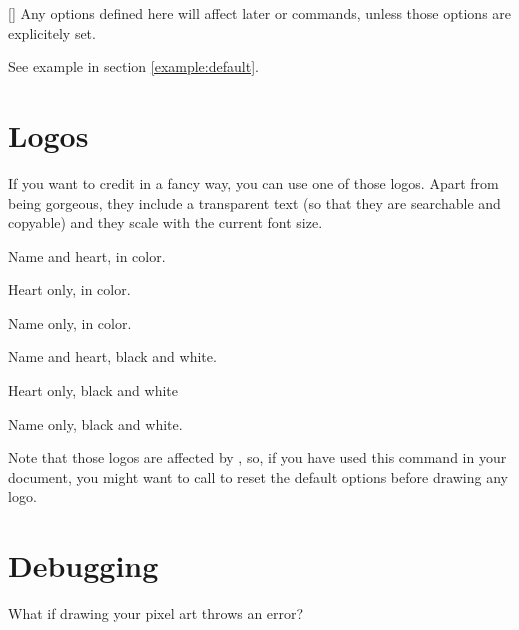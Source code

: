 \documentclass[
  load-preamble-,
  babel-options=english,
  add-index=true,
]{cnltx-doc}
\begin{document}
\begin{commands}
  [] Any options defined here will affect later  or  commands, unless those options are explicitely set.

  See example in section \ref{example:default}.
\end{commands}

\section{Logos}

If you want to credit  in a fancy way, you can use one of those logos. Apart from being gorgeous, they include a transparent text (so that they are searchable and copyable) and they scale with the current font size.

\begin{multicols}{2}
\begin{commands}
  \pixelartlogo{}
  Name and heart, in color.

  \pixelartheart{}
  Heart only, in color.

  \pixelartname{}
  Name only, in color.

  \pixelartlogobw{}
  Name and heart, black and white.

  \pixelartheartbw{}
  Heart only, black and white

  \pixelartnamebw{}
  Name only, black and white.
\end{commands}
\end{multicols}

Note that those logos are affected by , so, if you have used this command in your document, you might want to call \marg{} to reset the default options before drawing any logo.

\section{Debugging}

What if drawing your pixel art throws an error?
\end{document}
